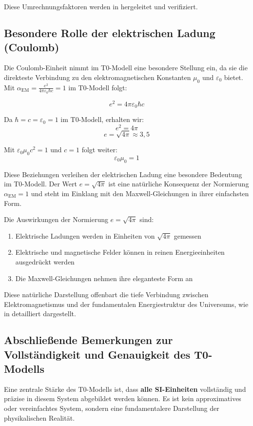 \documentclass[12pt,a4paper]{article}
\newcommand{\alphaEM}{\alpha_{\text{EM}}}
\begin{document}
Diese Umrechnungsfaktoren werden in \cite{pascher_conversions_2025} hergeleitet und verifiziert.

\subsection*{Besondere Rolle der elektrischen Ladung (Coulomb)}

Die Coulomb-Einheit nimmt im T0-Modell eine besondere Stellung ein, da sie die direkteste Verbindung zu den elektromagnetischen Konstanten $\mu_0$ und $\varepsilon_0$ bietet. Mit $\alphaEM = \frac{e^2}{4\pi\varepsilon_0\hbar c} = 1$ im T0-Modell folgt:

\[
e^2 = 4\pi\varepsilon_0\hbar c
\]

Da $\hbar = c = \varepsilon_0 = 1$ im T0-Modell, erhalten wir:
\[
e^2 = 4\pi
\]
\[
e = \sqrt{4\pi} \approx 3,5
\]

Mit $\varepsilon_0\mu_0c^2 = 1$ und $c = 1$ folgt weiter:
\[
\varepsilon_0\mu_0 = 1
\]

Diese Beziehungen verleihen der elektrischen Ladung eine besondere Bedeutung im T0-Modell. Der Wert $e = \sqrt{4\pi}$ ist eine natürliche Konsequenz der Normierung $\alphaEM = 1$ und steht im Einklang mit den Maxwell-Gleichungen in ihrer einfachsten Form.

Die Auswirkungen der Normierung $e = \sqrt{4\pi}$ sind:
\begin{enumerate}
	\item Elektrische Ladungen werden in Einheiten von $\sqrt{4\pi}$ gemessen
	\item Elektrische und magnetische Felder können in reinen Energieeinheiten ausgedrückt werden
	\item Die Maxwell-Gleichungen nehmen ihre eleganteste Form an
\end{enumerate}

Diese natürliche Darstellung offenbart die tiefe Verbindung zwischen Elektromagnetismus und der fundamentalen Energiestruktur des Universums, wie in \cite{pascher_alpha_2025} detailliert dargestellt.

\subsection*{Abschließende Bemerkungen zur Vollständigkeit und Genauigkeit des T0-Modells}

Eine zentrale Stärke des T0-Modells ist, dass \textbf{alle SI-Einheiten} vollständig und präzise in diesem System abgebildet werden können. Es ist kein approximatives oder vereinfachtes System, sondern eine fundamentalere Darstellung der physikalischen Realität.
\end{document}
